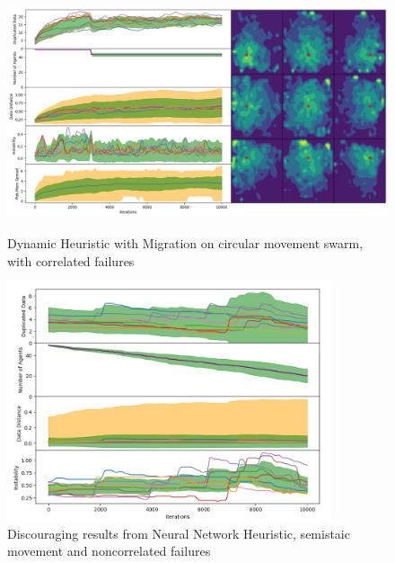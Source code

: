 \documentclass{UoYCSproject}
\begin{document}
\begin{figure}[htb]
\label{fig:circle_movement_con3}
\begin{center}
\centering
\includegraphics[height=7cm]{"./Dynamic_Migration/Circle_Move_con.png"}
\caption{Dynamic Heuristic with Migration on circular movement swarm, with correlated failures}
\end{center}
\end{figure}


\begin{figure}[htb]
\label{fig:Failed_GA}
\begin{center}
\centering
\includegraphics[height=7cm]{"./Failed_GA.png"}
\caption{Discouraging results from Neural Network Heuristic, semi\-staic movement and non\-correlated failures}
\end{center}
\end{figure}

\end{document}
